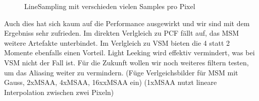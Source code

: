 \documentclass[runningheaders,a4paper]{llncs}
\begin{document}
\begin{figure}
	\centering
	
	\caption{LineSampling mit verschieden vielen Samples pro Pixel}
\end{figure}

Auch dies hat sich kaum auf die Performance ausgewirkt und wir sind mit dem Ergebniss sehr zufrieden.
Im direkten Verlgleich zu PCF fällt auf, das MSM weitere Artefakte unterbindet. Im Verlgleich zu VSM bieten die 4 statt 2 Momente ebenfalls einen Vorteil. Light Leeking wird effektiv vermindert, was bei VSM nicht der Fall ist.
Für die Zukunft wollen wir noch weiteres filtern testen, um das Aliasing weiter zu vermindern.
(Füge Verlgeichsbilder für MSM mit Gauss, 2xMSAA, 4xMSAA, 16xxMSAA ein)
(1xMSAA nutzt lineare Interpolation zwischen zwei Pixeln)
\end{document}
